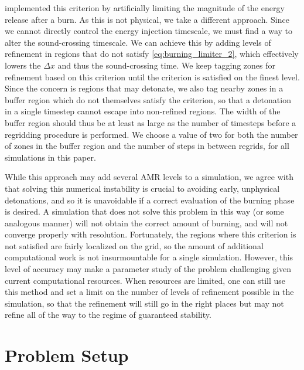\documentclass[twocolumn,numberedappendix]{../aastex6}
\begin{document}
\citet{kushnir:2013} implemented this criterion by artificially 
limiting the magnitude of the energy release after a burn. As 
this is not physical, we take a different approach. Since we 
cannot directly control the energy injection timescale, we 
must find a way to alter the sound-crossing timescale. 
We can achieve this by adding levels of refinement in 
regions that do not satisfy \autoref{eq:burning_limiter_2},
which effectively lowers the $\Delta x$ and thus the
sound-crossing time. We keep tagging zones for refinement
based on this criterion until the criterion is satisfied
on the finest level. Since the concern is regions that 
may detonate, we also tag nearby zones in a buffer region
which do not themselves satisfy the criterion,
so that a detonation in a single timestep cannot 
escape into non-refined regions. The width of the buffer 
region should thus be at least as large as the number of 
timesteps before a regridding procedure is performed.
We choose a value of two for both the number of zones in the 
buffer region and the number of steps in between regrids,
for all simulations in this paper.

While this approach may add several AMR levels 
to a simulation, we agree with \citet{kushnir:2013} that 
solving this numerical instability is crucial to avoiding
early, unphysical detonations, and so it is unavoidable
if a correct evaluation of the burning phase is desired.
A simulation that does not solve this problem in this way
(or some analogous manner) will not obtain the correct amount 
of burning, and will not converge properly with resolution. 
Fortunately, the regions where this criterion is not satisfied 
are fairly localized on the grid, so the amount of additional 
computational work is not insurmountable for a single simulation.
However, this level of accuracy may make a parameter study of
the problem challenging given current computational resources.
When resources are limited, one can still use this method and set a
limit on the number of levels of refinement possible in the simulation,
so that the refinement will still go in the right places but may not
refine all of the way to the regime of guaranteed stability. 



\section{Problem Setup}
\label{sec:problemsetup}
\end{document}
